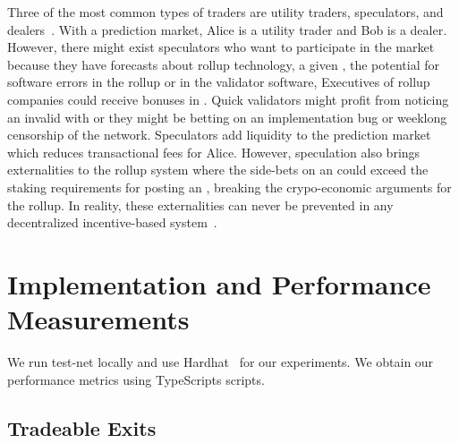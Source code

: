 Three of the most common types of traders are utility traders, speculators, and dealers~\cite{Har03}. With a prediction market, Alice is a utility trader and Bob is a dealer. However, there might exist speculators who want to participate in the market because they have forecasts about rollup technology, a given \rblock, the potential for software errors in the rollup or in the validator software, \etc Executives of rollup companies could receive bonuses in \final. Quick validators might profit from noticing an invalid \rblock with \fail or they might be betting on an implementation bug or weeklong censorship of the network. Speculators add liquidity to the prediction market which reduces transactional fees for Alice. However, speculation also brings externalities to the rollup system where the side-bets on an \rblock could exceed the staking requirements for posting an \rblock, breaking the crypo-economic arguments for the rollup. In reality, these externalities can never be prevented in any decentralized incentive-based system~\cite{FoBo19}. 

\section{Implementation and Performance Measurements} 

We run \arb \nitro test-net locally and use Hardhat~\cite{hardhatonline} for our experiments. We obtain our performance metrics using TypeScripts scripts. 


\subsection{Tradeable Exits}

